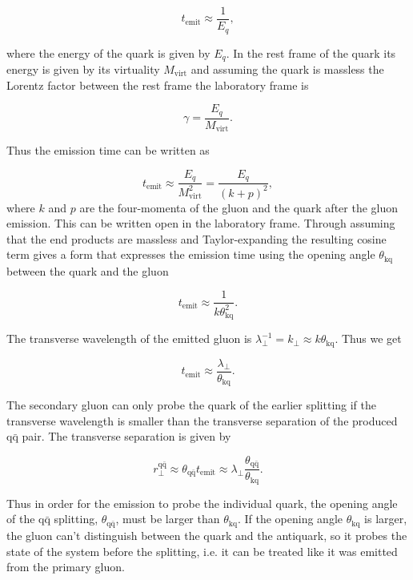 \begin{equation}
t_\mathrm{emit} \approx \frac{1}{E_q},
\end{equation}


\noindent where the energy of the quark is given by $E_q$. In the rest frame of the quark its energy is given by its virtuality $M_\mathrm{virt}$ and assuming the quark is massless the Lorentz factor between the rest frame the laboratory frame is 

\begin{equation}
\gamma = \frac{E_q}{M_\mathrm{virt}}.
\end{equation}

\noindent Thus the emission time can be written as

\begin{equation}
t_\mathrm{emit} \approx \frac{E_q}{M_\mathrm{virt}^2}  = \frac{E_q}{\left(k+p\right)^2},
\end{equation}
\noindent where $k$ and $p$ are the four-momenta of the gluon and the quark after the gluon emission. This can be written open in the laboratory frame. Through assuming that the end products are massless and Taylor-expanding the resulting cosine term gives a form that expresses the emission time using the opening angle $\theta_\mathrm{kq}$ between the quark and the gluon


\begin{equation}
t_\mathrm{emit} \approx \frac{1}{k\theta_\mathrm{kq}^2}.
\end{equation}


\noindent The transverse wavelength of the emitted gluon is $\lambda_\perp^{-1}=k_\perp\approx k\theta_\mathrm{kq}$. Thus we get

\begin{equation}
t_\mathrm{emit} \approx \frac{\lambda_\perp}{\theta_\mathrm{kq}}.
\end{equation}

\noindent The secondary gluon can only probe the quark of the earlier splitting if the transverse wavelength is smaller than the transverse separation of the produced $\mathrm{q \bar q}$ pair. The transverse separation is given by

\begin{equation}
r_\perp^{\mathrm{q \bar q}} \approx \theta_\mathrm{q \bar q} t_\mathrm{emit} \approx \lambda_\perp \frac{\theta_\mathrm{q \bar q} }{\theta_\mathrm{k q} }.
\end{equation}

Thus in order for the emission to probe the individual quark, the opening angle of the $\mathrm{q \bar q}$ splitting, $\theta_\mathrm{q \bar q}$, must be larger than $\theta_\mathrm{k q}$. If the opening angle $\theta_\mathrm{k q}$ is larger, the gluon can't distinguish between the quark and the antiquark, so it probes the state of the system before the splitting, i.e. it can be treated like it was emitted from the primary gluon.  


